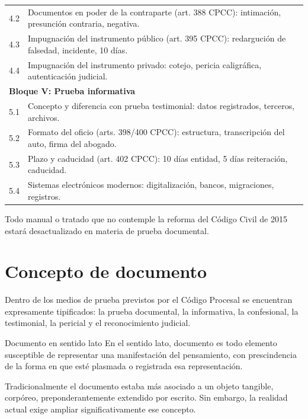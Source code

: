 \documentclass[12pt,oneside]{book}
\begin{document}
\begin{longtable}{p{}p{}}
4.2 & Documentos en poder de la contraparte (art. 388 CPCC): intimación, presunción contraria, negativa. \\
4.3 & Impugnación del instrumento público (art. 395 CPCC): redargución de falsedad, incidente, 10 días. \\
4.4 & Impugnación del instrumento privado: cotejo, pericia caligráfica, autenticación judicial. \\
\midrule
\multicolumn{2}{l}{\textbf{Bloque V: Prueba informativa}} \\
\midrule
5.1 & Concepto y diferencia con prueba testimonial: datos registrados, terceros, archivos. \\
5.2 & Formato del oficio (arts. 398/400 CPCC): estructura, transcripción del auto, firma del abogado. \\
5.3 & Plazo y caducidad (art. 402 CPCC): 10 días entidad, 5 días reiteración, caducidad. \\
5.4 & Sistemas electrónicos modernos: digitalización, bancos, migraciones, registros. \\
\bottomrule
\end{longtable}

\begin{important}
Todo manual o tratado que no contemple la reforma del Código Civil de 2015 estará desactualizado en materia de prueba documental.
\end{important}

\chapter{Concepto de documento}

Dentro de los medios de prueba previstos por el Código Procesal se encuentran expresamente tipificados: la prueba documental, la informativa, la confesional, la testimonial, la pericial y el reconocimiento judicial.

\begin{definition}{Documento en sentido lato}
En el sentido lato, documento es todo elemento susceptible de representar una manifestación del pensamiento, con prescindencia de la forma en que esté plasmada o registrada esa representación.
\end{definition}

Tradicionalmente el documento estaba más asociado a un objeto tangible, corpóreo, preponderantemente extendido por escrito. Sin embargo, la realidad actual exige ampliar significativamente ese concepto.
\end{document}
